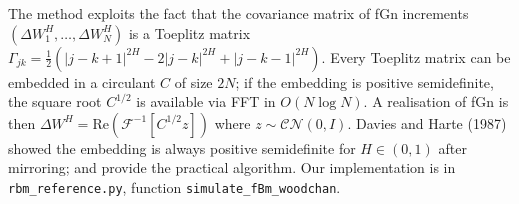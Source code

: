 \documentclass[11pt,a4paper]{article}
\begin{document}
The method exploits the fact that the covariance matrix of fGn increments
$(\Delta W^H_1, \ldots, \Delta W^H_N)$ is a Toeplitz matrix
$\Gamma_{jk} = \tfrac{1}{2}(|j-k+1|^{2H} - 2|j-k|^{2H} + |j-k-1|^{2H})$.
Every Toeplitz matrix can be embedded in a circulant $C$ of size $2N$;
if the embedding is positive semidefinite, the square root
$C^{1/2}$ is available via FFT in $O(N\log N)$. A realisation
of fGn is then $\Delta W^H = \mathrm{Re}(\mathcal{F}^{-1}[C^{1/2}z])$
where $z \sim \mathcal{CN}(0, I)$. Davies and Harte (1987) showed the
embedding is always positive semidefinite for $H \in (0,1)$ after
mirroring; \citet{wood1994simulation} and \citet{dietrich1997fast}
provide the practical algorithm. Our implementation is in
\texttt{rbm\_reference.py}, function \texttt{simulate\_fBm\_woodchan}.



\end{document}
